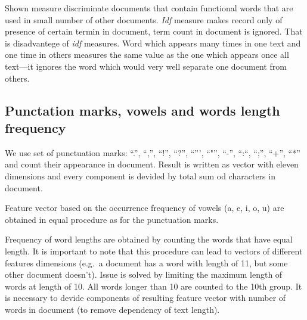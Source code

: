 \documentclass[11pt,english]{article}
\begin{document}
\begin{multicols}{2}
Shown measure discriminate documents that contain functional words that are
used in small number of other documents. \emph{Idf} measure makes record only
of presence of certain termin in document, term count in document is ignored.
That is disadvantege of \emph{idf} measures. Word which appears many times in one
text and one time in others measures the same value as the one which appears
once all text---it ignores the word which would very well separate one
document from others.

\subsection{Punctation marks, vowels and words length frequency}
\label{sec:znacajke-manje}
We use set of punctuation marks: ``.'', ``,'', ``!'', ``?'', ``''',
``"'', ``-'', ``:``, ``;'', ``+'', ``*'' and count their appearance in document.
Result is written as vector with eleven dimensions and every component is devided
by total sum od characters in document.

Feature vector based on the occurrence frequency of vowels (a, e, i, o, u) are
obtained in equal procedure as for the punctuation marks.

Frequency of word lengths are obtained by counting the words that have equal
length. It is important to note that this procedure can lead to vectors of
different features dimensions (e.g.\ a document has a word with length of 11,
but some other document doesn't). Issue is solved by limiting the maximum length
of words at length of 10. All words longer than 10 are counted to
the 10th group. It is necessary to devide components of resulting feature
vector with number of words in document (to remove dependency of text length).


\end{multicols}
\end{document}
